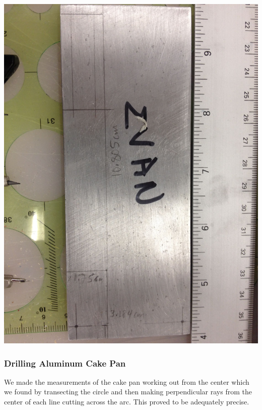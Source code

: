 \documentclass[11pt]{article} %
\begin{document}
\begin{center}
\includegraphics[scale=0.12]{feed/03.jpeg}
\end{center}

\subsubsection{Drilling Aluminum Cake Pan}

We made the measurements of the cake pan working out from the center which we found by transecting the circle and then making perpendicular rays from the center of each line cutting across the arc. This proved to be adequately precise. 
\end{document}
